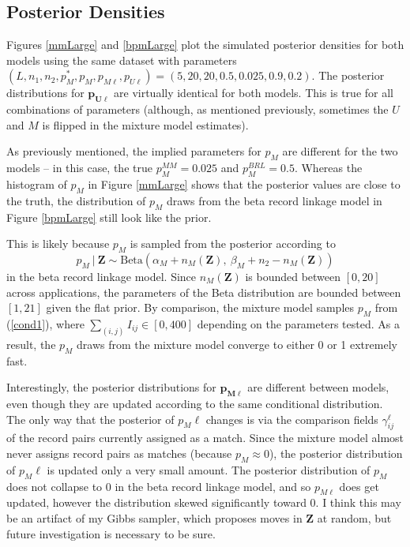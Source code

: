 \documentclass[11pt,reqno]{amsart}
\begin{document}
\subsection{Posterior Densities}

Figures \ref{mmLarge} and \ref{bpmLarge} plot the simulated posterior densities for both models using the same dataset with parameters $(L, n_1, n_2, p_M^*, p_M, p_{M\ell}, p_{U\ell}) = (5, 20, 20, 0.5,0.025,0.9,0.2)$.   The posterior distributions for $\mathbf{p_{U\ell}}$ are virtually identical for both models.  This is true for all combinations of parameters (although, as mentioned previously, sometimes the $U$ and $M$ is flipped in the mixture model estimates).  

As previously mentioned, the implied parameters for $p_M$ are different for the two models -- in this case, the true $p_M^{MM} = 0.025$ and $p_M^{BRL} = 0.5$.  Whereas the histogram of $p_M$ in Figure \ref{mmLarge} shows that the posterior values are close to the truth, the distribution of $p_M$ draws from the beta record linkage model in Figure \ref{bpmLarge} still look like the prior.  

This is likely because $p_M$ is sampled from the posterior according to 
\begin{equation} p_M\ |\ \mathbf{Z} \sim \text{Beta}(\alpha_M + n_{M}(\mathbf{Z}),\ \beta_M + n_{2} - n_{M}(\mathbf{Z})) \end{equation}
in the beta record linkage model.  Since $n_M(\textbf{Z})$ is bounded between $[0,20]$ across applications, the parameters of the Beta distribution are bounded between $[1,21]$ given the flat prior.  By comparison, the mixture model samples $p_M$ from (\ref{cond1}), where $\sum_{(i,j)}I_{ij} \in [0,400]$ depending on the parameters tested.  As a result, the $p_M$ draws from the mixture model converge to either 0 or 1 extremely fast. 

Interestingly, the posterior distributions for $\mathbf{p_{M\ell}}$ are different between models, even though they are updated according to the same conditional distribution.  The only way that the posterior of $p_M{\ell}$ changes is via the comparison fields $\gamma_{ij}^{\ell}$ of the record pairs currently assigned as a match.  Since the mixture model almost never assigns record pairs as matches (because $p_M \approx 0$), the posterior distribution of $p_M{\ell}$ is updated only a very small amount.  The posterior distribution of $p_M$ does not collapse to 0 in the beta record linkage model, and so $p_{M\ell}$ does get updated, however the distribution skewed significantly toward 0.  I think this may be an artifact of my Gibbs sampler, which proposes moves in $\mathbf{Z}$ at random, but future investigation is necessary to be sure. 
\end{document}
